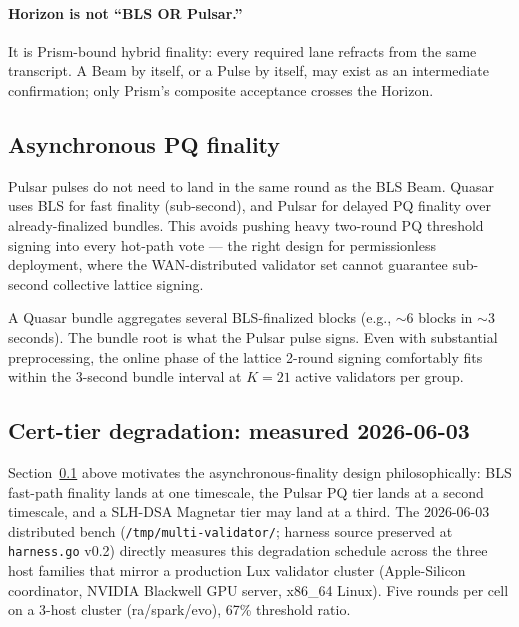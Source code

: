 \paragraph{Horizon is not ``BLS OR Pulsar.''} It is Prism-bound hybrid
finality: every required lane refracts from the same transcript. A
Beam by itself, or a Pulse by itself, may exist as an intermediate
confirmation; only Prism's composite acceptance crosses the Horizon.

\subsection{Asynchronous PQ finality}
\label{sec:asynchronous-pq-finality}

Pulsar pulses do not need to land in the same round as the BLS Beam.
Quasar uses BLS for fast finality (sub-second), and Pulsar for
delayed PQ finality over already-finalized bundles. This avoids
pushing heavy two-round PQ threshold signing into every hot-path
vote --- the right design for permissionless deployment, where the
WAN-distributed validator set cannot guarantee sub-second
collective lattice signing.

A Quasar bundle aggregates several BLS-finalized blocks (e.g.,
$\sim 6$ blocks in $\sim 3$ seconds). The bundle root is what the
Pulsar pulse signs. Even with substantial preprocessing, the online
phase of the lattice 2-round signing comfortably fits within the
3-second bundle interval at $K = 21$ active validators per group.

\subsection{Cert-tier degradation: measured 2026-06-03}
\label{sec:cert-tier-degradation}

Section~\ref{sec:asynchronous-pq-finality} above motivates the
asynchronous-finality design philosophically: BLS fast-path
finality lands at one timescale, the Pulsar PQ tier lands at a
second timescale, and a SLH-DSA Magnetar tier may land at a third.
The 2026-06-03 distributed bench
(\texttt{/tmp/multi-validator/}; harness source preserved at
\texttt{harness.go} v0.2) directly measures this degradation
schedule across the three host families that mirror a production
Lux validator cluster (Apple-Silicon coordinator, NVIDIA Blackwell
GPU server, x86\_64 Linux). Five rounds per cell on a 3-host
cluster (ra/spark/evo), 67\% threshold ratio.

